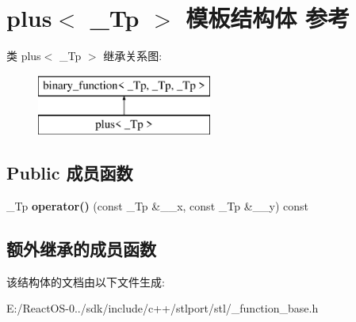 \hypertarget{structplus}{}\section{plus$<$ \+\_\+\+Tp $>$ 模板结构体 参考}
\label{structplus}
类 plus$<$ \+\_\+\+Tp $>$ 继承关系图\+:\begin{figure}[H]
\begin{center}
\leavevmode
\includegraphics[height=2.000000cm]{structplus}
\end{center}
\end{figure}
\subsection*{Public 成员函数}
\begin{DoxyCompactItemize}
\item 
\mbox{\label{structplus_a1c5ffa022b16aed001843cc8e6c3102b}} 
\+\_\+\+Tp {\bfseries operator()} (const \+\_\+\+Tp \&\+\_\+\+\_\+x, const \+\_\+\+Tp \&\+\_\+\+\_\+y) const
\end{DoxyCompactItemize}
\subsection*{额外继承的成员函数}


该结构体的文档由以下文件生成\+:\begin{DoxyCompactItemize}
\item 
E\+:/\+React\+O\+S-\/0../sdk/include/c++/stlport/stl/\+\_\+function\+\_\+base.\+h\end{DoxyCompactItemize}
